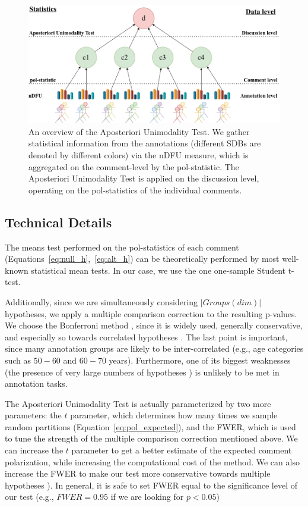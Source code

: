 \documentclass{article}
\newcommand{\sdbdim}{\textit{dim}}
\newcommand{\Sdbgroup}{\textit{Groups}}
\begin{document}
\begin{figure}
	\includegraphics[width=\linewidth]{overview.png}
	\caption{An overview of the Aposteriori Unimodality Test. We gather statistical information from the annotations (different \acp{SDB} are denoted by different colors) via the \ac{nDFU} measure, which is aggregated on the comment-level by the pol-statistic. The Aposteriori Unimodality Test is applied on the discussion level, operating on the pol-statistics of the individual comments.}
	\label{fig::overview}
\end{figure}


\subsection{Technical Details}
\label{ssec:methodology:details}

The means test performed on the pol-statistics of each comment (Equations~\ref{eq:null_h},~\ref{eq:alt_h}) can be theoretically performed by most well-known statistical mean tests. In our case, we use the one one-sample Student t-test. 

Additionally, since we are simultaneously considering $\lvert \Sdbgroup(\sdbdim) \rvert$ hypotheses, we apply a multiple comparison correction to the resulting p-values. We choose the Bonferroni method \parencite{Bland170}, since it is widely used, generally conservative, and especially so towards correlated hypotheses \parencite{ChenFengYi2017}. The last point is important, since many annotation groups are likely to be inter-correlated (e.g., age categories such as $50-60$ and $60-70$ years). Furthermore, one of its biggest weaknesses (the presence of very large numbers of hypotheses \parencite{ChenFengYi2017}) is unlikely to be met in annotation tasks.

The Aposteriori Unimodality Test is actually parameterized by two more parameters: the $t$ parameter, which determines how many times we sample random partitions (Equation~\ref{eq:pol_expected}), and the \ac{FWER}, which is used to tune the strength of the multiple comparison correction mentioned above. We can increase the $t$ parameter to get a better estimate of the expected comment polarization, while increasing the computational cost of the method. We can also increase the \ac{FWER} to make our test more conservative towards multiple hypotheses \parencite{ChenFengYi2017}). In general, it is safe to set \ac{FWER} equal to the significance level of our test (e.g., $\textit{FWER} = 0.95$ if we are looking for $p < 0.05$)
\end{document}
